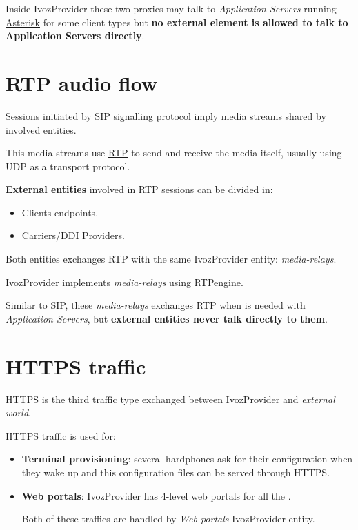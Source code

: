 \documentclass[letterpaper,10pt,spanish]{sphinxmanual}
\begin{document}
Inside IvozProvider these two proxies may talk to \emph{Application Servers} running
\href{http://www.asterisk.org/}{Asterisk} for some client types but \textbf{no external
element is allowed to talk to Application Servers directly}.


\section{RTP audio flow}
\label{basic_concepts/architecture/index:rtp-audio-flow}\label{basic_concepts/architecture/index:audioflow}
Sessions initiated by SIP signalling protocol imply media streams shared by
involved entities.

This media streams use \href{https://tools.ietf.org/html/rfc3550}{RTP} to send and
receive the media itself, usually using UDP as a transport protocol.

\textbf{External entities} involved in RTP sessions can be divided in:
\begin{itemize}
\item {} 
Clients endpoints.

\item {} 
Carriers/DDI Providers.

\end{itemize}

Both entities exchanges RTP with the same IvozProvider entity: \emph{media-relays}.

IvozProvider implements \emph{media-relays} using \href{https://github.com/sipwise/rtpengine}{RTPengine}.

Similar to SIP, these \emph{media-relays} exchanges RTP when is needed with
\emph{Application Servers}, but \textbf{external entities never talk directly to them}.


\section{HTTPS traffic}
\label{basic_concepts/architecture/index:https-traffic}
HTTPS is the third traffic type exchanged between IvozProvider and \emph{external
world}.

HTTPS traffic is used for:
\begin{itemize}
\item {} 
\textbf{Terminal provisioning}: several hardphones ask for their configuration when
they wake up and this configuration files can be served through HTTPS.

\item {} 
\textbf{Web portals}: IvozProvider has 4-level web portals for all the
{\hyperref[basic_concepts/operation_roles/index:operation\string-roles]{}}.

Both of these traffics are handled by \emph{Web portals} IvozProvider entity.

\end{itemize}
\end{document}

